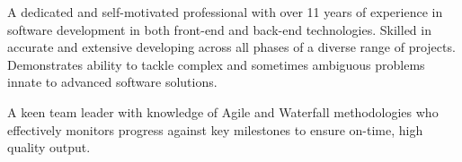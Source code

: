 

\begin{cvparagraph}

A dedicated and self-motivated professional with over 11 years of experience in software development in both front-end and back-end technologies. Skilled in accurate and extensive developing across all phases of a diverse range of projects.
Demonstrates ability to tackle complex and sometimes ambiguous problems innate to advanced software solutions.

A keen team leader with knowledge of Agile and Waterfall methodologies who effectively monitors progress against key milestones to ensure on-time, high quality output.
\end{cvparagraph}
